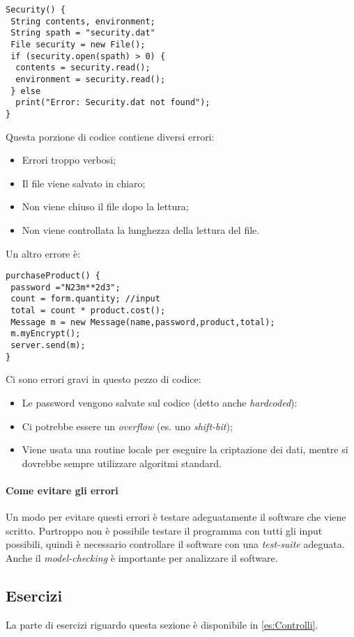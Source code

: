 \begin{verbatim}
Security() {
 String contents, environment;
 String spath = "security.dat"
 File security = new File();
 if (security.open(spath) > 0) {
  contents = security.read();
  environment = security.read();
 } else
  print("Error: Security.dat not found");
}
\end{verbatim}

Questa porzione di codice contiene diversi errori:
\begin{itemize}
\item Errori troppo verbosi;
\item Il file viene salvato in chiaro;
\item Non viene chiuso il file dopo la lettura;
\item Non viene controllata la lunghezza della lettura del file.
\end{itemize}

Un altro errore è:
\begin{verbatim}
purchaseProduct() {
 password ="N23m**2d3";
 count = form.quantity; //input
 total = count * product.cost();
 Message m = new Message(name,password,product,total);
 m.myEncrypt();
 server.send(m);
}
\end{verbatim}

Ci sono errori gravi in questo pezzo di codice:
\begin{itemize}
\item Le password vengono salvate sul codice (detto anche \textit{hardcoded}):
\item Ci potrebbe essere un \textit{overflow} (es. uno \textit{shift-bit});
\item Viene usata una routine locale per eseguire la criptazione dei dati,
mentre si dovrebbe sempre utilizzare algoritmi standard.
\end{itemize}


\paragraph*{Come evitare gli errori} Un modo per evitare questi errori è
testare adeguatamente il software che viene scritto. Purtroppo non è possibile
testare il programma con tutti gli input possibili, quindi è necessario
controllare il software con una \textit{test-suite} adeguata.
Anche il \textit{model-checking} è importante per analizzare il software.

\subsection{Esercizi}

La parte di esercizi riguardo questa sezione è disponibile in \ref{es:Controlli}.







